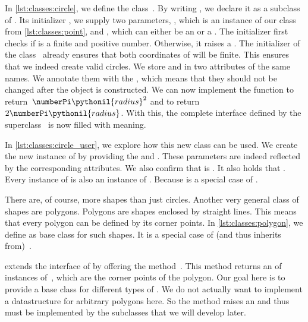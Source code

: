 In \cref{lst:classes:circle}, we define the class~.
By writing , we declare it as a subclass of .
Its initializer , we supply two parameters, , which is an instance of our class  from \cref{lst:classes:point}, and , which can either be an  or a .
The initializer first checks if  is a finite and positive number.
Otherwise, it raises a .
The initializer of the class~ already ensures that both coordinates of  will be finite.
This ensures that we indeed create valid circles.
We store  and  in two attributes of the same names.
We annotate them with the  , which means that they should not be changed after the object is constructed.
We can now implement the function  to return~$\numberPi\pythonil{radius}^2$ and  to return~$2\numberPi\pythonil{radius}$.
With this, the complete interface defined by the superclass~ is now filled with meaning.

In \cref{lst:classes:circle_user}, we explore how this new class can be used.
We create the new instance  of  by providing the  and .
These parameters are indeed reflected by the corresponding attributes.
We also confirm that  is .
It also holds that .
Every instance of  is also an instance of .
Because  is a special case of .

There are, of course, more shapes than just circles.
Another very general class of shapes are polygons.
Polygons are shapes enclosed by straight lines.
This means that every polygon can be defined by its corner points.
In \cref{lst:classes:polygon}, we define  as base class for such shapes.
It is a special case of (and thus inherits from)~.

 extends the interface of  by offering the method~.
This method returns an  of instances of~, which are the corner points of the polygon.
Our goal here is to provide a base class for different types of .
We do not actually want to implement a datastructure for arbitrary polygons here.
So the method  raises an  and thus must be implemented by the subclasses that we will develop later.

